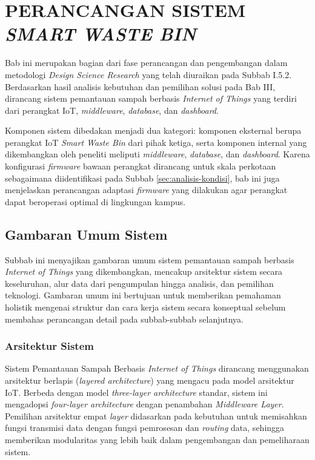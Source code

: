 \cleardoublepage
\chapter{PERANCANGAN SISTEM \textit{SMART WASTE BIN}}
\label{chap:perancangan}

Bab ini merupakan bagian dari fase perancangan dan pengembangan dalam metodologi \textit{Design Science Research} yang telah diuraikan pada Subbab I.5.2. Berdasarkan hasil analisis kebutuhan dan pemilihan solusi pada Bab III, dirancang sistem pemantauan sampah berbasis \textit{Internet of Things} yang terdiri dari perangkat IoT, \textit{middleware}, \textit{database}, dan \textit{dashboard}.

Komponen sistem dibedakan menjadi dua kategori: komponen eksternal berupa perangkat IoT \textit{Smart Waste Bin} dari pihak ketiga, serta komponen internal yang dikembangkan oleh peneliti meliputi \textit{middleware}, \textit{database}, dan \textit{dashboard}. Karena konfigurasi \textit{firmware} bawaan perangkat dirancang untuk skala perkotaan sebagaimana diidentifikasi pada Subbab \ref{sec:analisis-kondisi}, bab ini juga menjelaskan perancangan adaptasi \textit{firmware} yang dilakukan agar perangkat dapat beroperasi optimal di lingkungan kampus.

\section{Gambaran Umum Sistem}
\label{sec:gambaran-umum}

Subbab ini menyajikan gambaran umum sistem pemantauan sampah berbasis \textit{Internet of Things} yang dikembangkan, mencakup arsitektur sistem secara keseluruhan, alur data dari pengumpulan hingga analisis, dan pemilihan teknologi. Gambaran umum ini bertujuan untuk memberikan pemahaman holistik mengenai struktur dan cara kerja sistem secara konseptual sebelum membahas perancangan detail pada subbab-subbab selanjutnya.

\subsection{Arsitektur Sistem}

Sistem Pemantauan Sampah Berbasis \textit{Internet of Things} dirancang menggunakan arsitektur berlapis (\textit{layered architecture}) yang mengacu pada model arsitektur IoT. Berbeda dengan model \textit{three-layer architecture} standar, sistem ini mengadopsi \textit{four-layer architecture} dengan penambahan \textit{Middleware Layer}. Pemilihan arsitektur empat \textit{layer} didasarkan pada kebutuhan untuk memisahkan fungsi transmisi data dengan fungsi pemrosesan dan \textit{routing} data, sehingga memberikan modularitas yang lebih baik dalam pengembangan dan pemeliharaan sistem.

